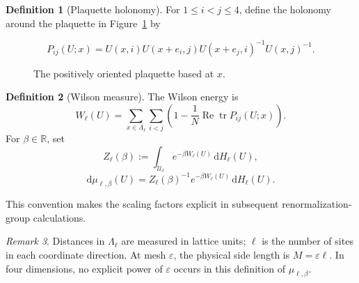 \documentclass[10pt,reqno]{amsart}
\theoremstyle{definition}
\newtheorem{definition}{Definition}[section]
\theoremstyle{remark}
\newtheorem{remark}[definition]{Remark}
\numberwithin{equation}{section}
\numberwithin{figure}{section}
\newcommand{\dd}{\mathrm d}
\newcommand{\R}{\mathbb R}
\newcommand{\e}{\varepsilon}
\DeclareMathOperator{\tr}{tr}
\begin{document}
\begin{definition}[Plaquette holonomy] For $1\le i<j\le4$, define the holonomy around the plaquette in Figure~\ref{fig:plaquette} by



\begin{equation}\label{eq:plaquette-holonomy}
P_{ij}(U;x)
 =U(x,i)U(x+e_i,j)U(x+e_j,i)^{-1}U(x,j)^{-1}.
\end{equation}
\end{definition}

\begin{figure}[htbp]
\centering
{}
\caption{The positively oriented plaquette based at $x$.}
\label{fig:plaquette}
\end{figure}

\begin{definition}[Wilson measure]
The Wilson energy is
\begin{equation}\label{eq:wilson-energy}
W_\ell(U)=\sum_{x\in\Lambda_\ell}\sum_{i<j}
 \left(1-\frac1N\operatorname{Re}\tr P_{ij}(U;x)\right).
\end{equation}
For $\beta\in\R$, set
\begin{equation}\label{eq:partition-function}
Z_\ell(\beta):=\int_{\mathcal U_\ell}e^{-\beta W_\ell(U)}\,\dd H_\ell(U),
\end{equation}
\begin{equation}\label{eq:wilson-measure}
\dd\mu_{\ell,\beta}(U)
 =Z_\ell(\beta)^{-1}e^{-\beta W_\ell(U)}\,\dd H_\ell(U).
\end{equation}
\end{definition}

This convention makes the scaling factors explicit in subsequent renormalization-group calculations.

\begin{remark} Distances in $\Lambda_\ell$ are measured in lattice units; $\ell$ is the number of sites in each coordinate direction.
At mesh $\e$, the physical side length is $M=\e\ell$.
In four dimensions, no explicit power of $\e$ occurs in this definition of $\mu_{\ell,\beta}$.

\end{remark}
\end{document}
